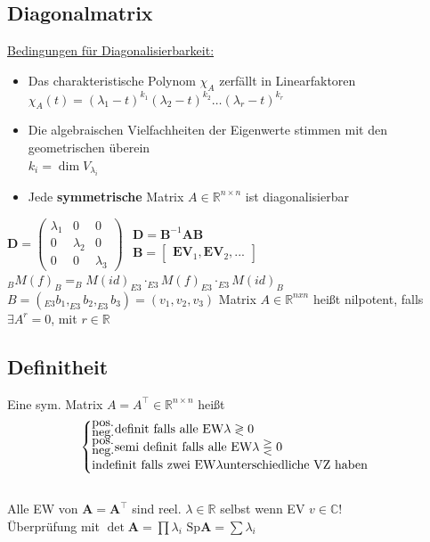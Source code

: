 \documentclass[6pt,a4paper]{scrartcl}
\newcommand{\mat}[1]{\ensuremath{\begin{bmatrix} #1 \end{bmatrix}}}                             %
\newcommand{\ma}[1]{\ensuremath{\boldsymbol {#1}}}                                              %
\renewcommand{\vec}[1]{\ensuremath{\boldsymbol {#1}}}                                           %
\newcommand{\R}{\ensuremath{\mathbb R}}
\begin{document}
\begin{multicols*}{4}
    \subsection{Diagonalmatrix}

    \underline{Bedingungen für Diagonalisierbarkeit:}
    \begin{itemize} \itemsep0pt
        \item Das charakteristische Polynom $\chi_{A}$ zerfällt in Linearfaktoren\\
              $\chi_{A}(t) = (\lambda_1 - t)^{k_1}(\lambda_2 - t)^{k_2}\ldots(\lambda_r - t)^{k_r}$
        \item Die algebraischen Vielfachheiten der Eigenwerte stimmen mit den geometrischen überein\\
              $k_i = \dim V_{\lambda_i}$
        \item Jede \textbf{symmetrische} Matrix $A \in \R^{n \times n}$ ist diagonalisierbar
    \end{itemize}

    $\ma D = \begin{pmatrix} \lambda_1 & 0 & 0 \\ 0 & \lambda_2 & 0 \\ 0 & 0 & \lambda_3 \end{pmatrix}$ \qquad $\begin{array}{l} \ma D = \ma B^{-1} \ma A \ma B \\[0.5em] \ma B = \mat{\vec{EV}_1, \vec{EV}_2, ...} \end{array}$\\
    $_B M(f)_B = _B M (id)_{E3} \cdot _{E3} M(f)_{E3} \cdot _{E3} M(id)_B$ \\
    $B = ( _{E3} b_1 , _{E3} b_2 ,_{E3} b_3 ) = (v_1, v_2, v_3)$
    \fi
    Matrix $A \in \R^{nxn}$ heißt nilpotent, falls $\exists A^r = 0$, mit $r \in \R$\\
    \subsection{Definitheit}
    Eine sym. Matrix $A = A^\top \in \mathbb R^{n\times n}$ heißt\\%
    \[\begin{cases}
            _{\text{\normalsize neg.}}^{\text{\normalsize pos.}} \text{definit falls alle EW} \lambda \gtrless 0        \\
            _{\text{\normalsize neg.}}^{\text{\normalsize pos.}} \text{semi definit falls alle EW} \lambda \gtreqless 0 \\
            \text{indefinit falls zwei EW} \lambda \text{unterschiedliche VZ haben}
        \end{cases}\]\\
    Alle EW von $\ma A = \ma A^\top$ sind reel. $\lambda \in \mathbb R$ selbst wenn EV $v \in \mathbb C$!\\
    Überprüfung mit $\det \ma A = \prod \lambda_i$ \qquad $\mathrm{Sp} \ma A = \sum \lambda_i$\\ \\


\end{multicols*}
\end{document}
